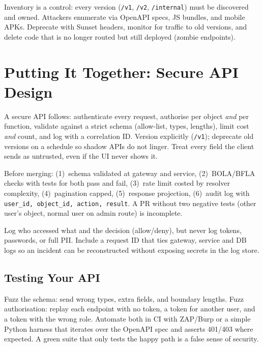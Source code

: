 \begin{remark}
Inventory is a control: every version (\texttt{/v1}, \texttt{/v2}, \texttt{/internal}) must be discovered and owned. Attackers enumerate via OpenAPI specs, JS bundles, and mobile APKs. Deprecate with Sunset headers, monitor for traffic to old versions, and delete code that is no longer routed but still deployed (zombie endpoints).
\end{remark}

\section{Putting It Together: Secure API Design}
\label{sec:api-design}
A secure API follows: authenticate every request, authorise per object \emph{and} per function, validate against a strict schema (allow-list, types, lengths), limit cost \emph{and} count, and log with a correlation ID. Version explicitly (\texttt{/v1}); deprecate old versions on a schedule so shadow APIs do not linger. Treat every field the client sends as untrusted, even if the UI never shows it.

\begin{example}
Before merging: (1)~schema validated at gateway and service, (2)~BOLA/BFLA checks with tests for both pass and fail, (3)~rate limit costed by resolver complexity, (4)~pagination capped, (5)~response projection, (6)~audit log with \texttt{user\_id, object\_id, action, result}. A PR without two negative tests (other user's object, normal user on admin route) is incomplete.
\end{example}

\begin{remark}
Log who accessed what and the decision (allow/deny), but never log tokens, passwords, or full PII. Include a request ID that ties gateway, service and DB logs so an incident can be reconstructed without exposing secrets in the log store.
\end{remark}

\subsection{Testing Your API}
Fuzz the schema: send wrong types, extra fields, and boundary lengths. Fuzz authorisation: replay each endpoint with no token, a token for another user, and a token with the wrong role. Automate both in CI with ZAP/Burp or a simple Python harness that iterates over the OpenAPI spec and asserts 401/403 where expected. A green suite that only tests the happy path is a false sense of security.


